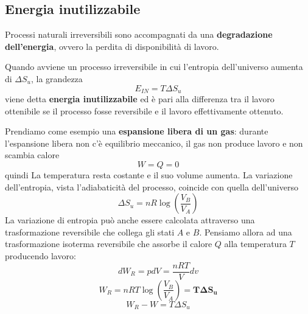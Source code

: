 \documentclass[x11names]{report}
\begin{document}
	\subsection{Energia inutilizzabile}
	Processi naturali irreversibili sono accompagnati da una \textbf{degradazione dell'energia}, ovvero la perdita di disponibilità di lavoro.
	\begin{center}
		\colorbox{yred}{\begin{minipage}{5.75in}
				\begin{redes}{}
					Quando avviene un processo irreversibile in cui l'entropia dell'universo aumenta di \(\Delta S_{u}\), la grandezza
					\[ 
					E_{IN} = T\Delta S_{u}
					\]
					viene detta \textbf{energia inutilizzabile} ed è pari alla differenza tra il lavoro ottenibile se il processo fosse reversibile e il lavoro effettivamente ottenuto.
				\end{redes}
		\end{minipage}}
	\end{center}
	
	Prendiamo come esempio  una \textbf{espansione libera di un gas}: durante l'espansione libera non c'è equilibrio meccanico, il gas non produce lavoro e non scambia calore
	\[ 
	W = Q = 0
	\]
	quindi La temperatura resta costante e il suo volume aumenta. La variazione dell'entropia, vista l'adiabaticità del processo, coincide con quella dell'universo
	\[ 
	\Delta S_{u} = nR\log\left(\frac{V_{B}}{V_{A}}\right)
	\]
	La variazione di entropia può anche essere calcolata attraverso una trasformazione reversibile che collega gli stati \(A\) e \(B\). Pensiamo allora ad una trasformazione isoterma reversibile che assorbe il calore \(Q\) alla temperatura \(T\) producendo lavoro:
	\[ 
	dW_{R} = pdV = \frac{nRT}{V}dv
	\] 
	\[ 
	W_{R} = nRT\log\left(\frac{V_{B}}{V_{A}}\right) = \boldsymbol{T\Delta S_{u}}
	\]
	\[ 
	\boxed{W_{R} - W = T\Delta S_{u}}
	\]
	
\end{document}
